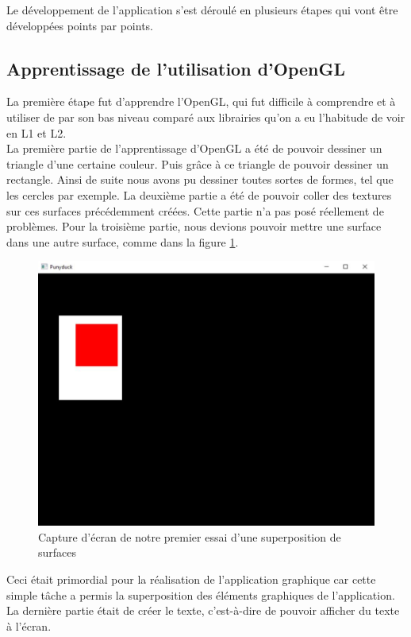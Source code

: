 \documentclass[twoside]{report}
\begin{document}
Le développement de l'application s'est déroulé en plusieurs étapes qui vont être développées points par points.

\subsection{Apprentissage de l'utilisation d'OpenGL}
La première étape fut d'apprendre l'OpenGL, qui fut difficile à comprendre et à utiliser de par son bas niveau comparé aux librairies qu'on a eu l'habitude de voir en L1 et L2. \\
La première partie de l'apprentissage d'OpenGL a été de pouvoir dessiner un triangle d'une certaine couleur. Puis grâce à ce triangle de pouvoir dessiner un rectangle. Ainsi de suite nous avons pu dessiner toutes sortes de formes, tel que les cercles par exemple.
La deuxième partie a été de pouvoir coller des textures sur ces surfaces précédemment créées. Cette partie n'a pas posé réellement de problèmes.
Pour la troisième partie, nous devions pouvoir mettre une surface dans une autre surface, comme dans la figure \ref{exsurface}.
\begin{figure}
    \begin{center}
        \includegraphics[scale=0.3]{exempleSurface.jpg}
        \caption{Capture d'écran de notre premier essai d'une superposition de surfaces}
        \label{exsurface}
    \end{center}
\end{figure}
Ceci était primordial pour la réalisation de l'application graphique car cette simple tâche a permis la superposition des éléments graphiques de l'application. \\
La dernière partie était de créer le texte, c'est-à-dire de pouvoir afficher du texte à l'écran. \\
\end{document}
